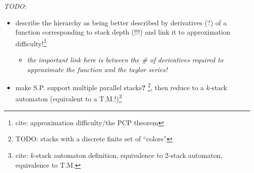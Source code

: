 \documentclass[10pt]{article}
\newcommand{\todocite}[1]{\footnote{cite: #1}}
\newcommand{\todo}[1]{\textbf{?} \footnote{TODO: #1}}
\begin{document}
\textit{TODO:}
\begin{itemize}
\item describe the hierarchy as being better described by derivatives (?) of a function corresponding to stack depth (!!!) and link it to approximation difficulty!\todocite{approximation difficulty/the PCP theorem}
\begin{itemize}
\item \textit{the important link here is between the \# of derivatives required to approximate the function and the taylor series!}
\end{itemize}
\item make S.P. support multiple parallel stacks\todo{stacks with a discrete finite set of ``colors''}, then reduce  to a $k$-stack automaton (equivalent to a T.M.!)\todocite{$k$-stack automaton definition, equivalence to 2-stack automaton, equivalence to T.M.}
\end{itemize}

\newpage
\printbibliography
\end{document}
